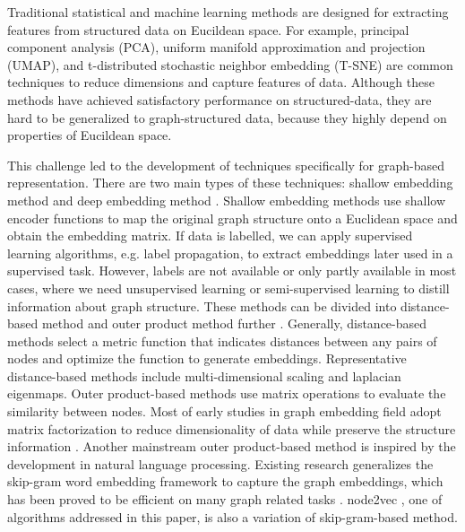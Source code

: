 \documentclass[sigconf]{acmart}
\begin{document}
Traditional statistical and machine learning methods are designed for extracting features from structured data on Eucildean space. For example, principal component analysis (PCA), uniform manifold approximation and projection (UMAP), and t-distributed stochastic neighbor embedding (T-SNE) are common techniques to reduce dimensions and capture features of data. Although these methods have achieved satisfactory performance on structured-data, they are hard to be generalized to graph-structured data, because they highly depend on properties of Eucildean space.\par

This challenge led to the development of techniques specifically for graph-based representation. There are two main types of these techniques: shallow embedding method and deep embedding method \cite{murphy2022}. Shallow embedding methods use shallow encoder functions to map the original graph structure onto a Euclidean space and obtain the embedding matrix. If data is labelled, we can apply supervised learning algorithms, e.g. label propagation, to extract embeddings later used in a supervised task. However, labels are not available or only partly available in most cases, where we need unsupervised learning or semi-supervised learning to distill information about graph structure. These methods can be divided into distance-based method and outer product method further \cite{murphy2022}. Generally, distance-based methods select a metric function that indicates distances between any pairs of nodes and optimize the function to generate embeddings. Representative distance-based methods include multi-dimensional scaling and laplacian eigenmaps. Outer product-based methods use matrix operations to evaluate the similarity between nodes. Most of early studies in graph embedding field adopt matrix factorization to reduce dimensionality of data while preserve the structure information \cite{cai2018}. Another mainstream outer product-based method is inspired by the development in natural language processing. Existing research generalizes the skip-gram word embedding framework to capture the graph embeddings, which has been proved to be efficient on many graph related tasks \cite{deepwalk}\cite{line}. node2vec \cite{node2vec}, one of algorithms addressed in this paper, is also a variation of skip-gram-based method.\par
\end{document}
